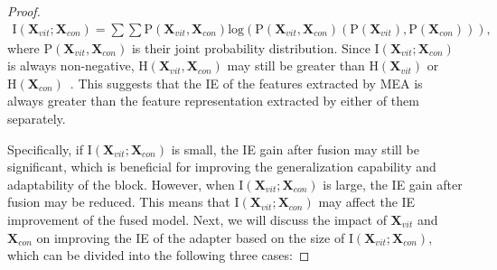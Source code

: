 \begin{proof}
\begin{equation}
\begin{split}
\label{eqs:3}
\textrm{I}(\textbf{X}_{vit}; \textbf{X}_{con}) = \sum\sum \textrm{P}(\textbf{X}_{vit}, \textbf{X}_{con}) \textrm{log}(\textrm{P}(\textbf{X}_{vit}, \textbf{X}_{con}) (\textrm{P}(\textbf{X}_{vit}), \textrm{P}(\textbf{X}_{con}))),
\end{split}
\end{equation}
where $\textrm{P}(\textbf{X}_{vit}, \textbf{X}_{con})$ is their joint probability distribution. 
Since $\textrm{I}(\textbf{X}_{vit}; \textbf{X}_{con})$ is always non-negative, $\textrm{H}(\textbf{X}_{vit}, \textbf{X}_{con})$ may still be greater than $\textrm{H}(\textbf{X}_{vit})$ or $\textrm{H}(\textbf{X}_{con})$~\citep{paninski2003estimation,gabrie2018entropy}. This suggests that the IE of the features extracted by MEA is always greater than the feature representation extracted by either of them separately.

Specifically, if $\textrm{I}(\textbf{X}_{vit}; \textbf{X}_{con})$ is small, the IE gain after fusion may still be significant, which is beneficial for improving the generalization capability and adaptability of the block. However, when $\textrm{I}(\textbf{X}_{vit}; \textbf{X}_{con})$ is large, the IE gain after fusion may be reduced. This means that $\textrm{I}(\textbf{X}_{vit}; \textbf{X}_{con})$ may affect the IE improvement of the fused model. Next, we will discuss the impact of $\textbf{X}_{vit}$ and $\textbf{X}_{con}$ on improving the IE of the adapter based on the size of $\textrm{I}(\textbf{X}_{vit}; \textbf{X}_{con})$, which can be divided into the following three cases:


\end{proof}
